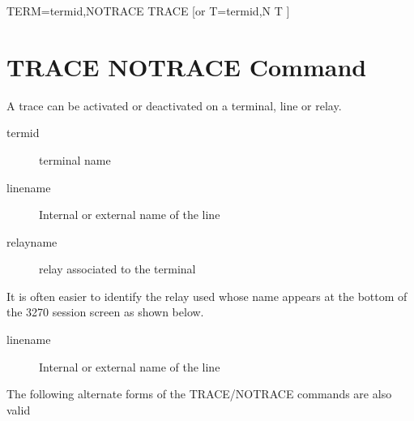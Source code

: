 \documentclass[letterpaper,10pt,english]{sphinxmanual}
\begin{document}
TERM=termid,NOTRACE \textbar{} TRACE  {[}or T=termid,N \textbar{} T {]}

\newpage


\section{TRACE \textbar{} NOTRACE Command}
\label{\detokenize{audit_operations_ and_performance:trace-notrace-command}}\label{\detokenize{audit_operations_ and_performance:index-28}}
A trace can be activated or deactivated on a terminal, line or relay.

\begin{sphinxVerbatim}[commandchars=\\\{\}]
\end{sphinxVerbatim}
\begin{description}
\item[{termid}] \leavevmode
terminal name

\item[{linename}] \leavevmode
Internal or external name of the line

\item[{relayname}] \leavevmode
relay associated to the terminal

\end{description}

It is often easier to identify the relay used whose name appears at the bottom of the 3270 session screen as shown below.

\begin{description}
\item[{linename}] \leavevmode
Internal or external name of the line

\end{description}

The following alternate forms of the TRACE/NOTRACE commands are also  valid
\end{document}
